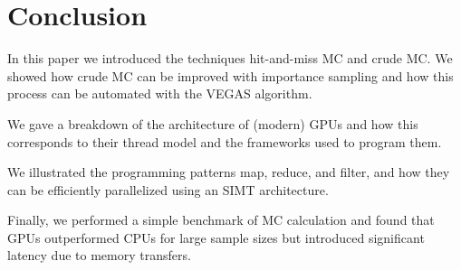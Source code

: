 \section*{Conclusion}
In this paper we introduced the techniques hit-and-miss MC and crude MC.
We showed how crude MC can be improved with importance sampling and how this process can be automated with the VEGAS algorithm.

We gave a breakdown of the architecture of (modern) GPUs and how this corresponds to their thread model
and the frameworks used to program them.

We illustrated the programming patterns map, reduce, and filter, and how they can be efficiently parallelized using an SIMT architecture.

Finally, we performed a simple benchmark of MC calculation and found that GPUs outperformed CPUs for large sample sizes
but introduced significant latency due to memory transfers.

